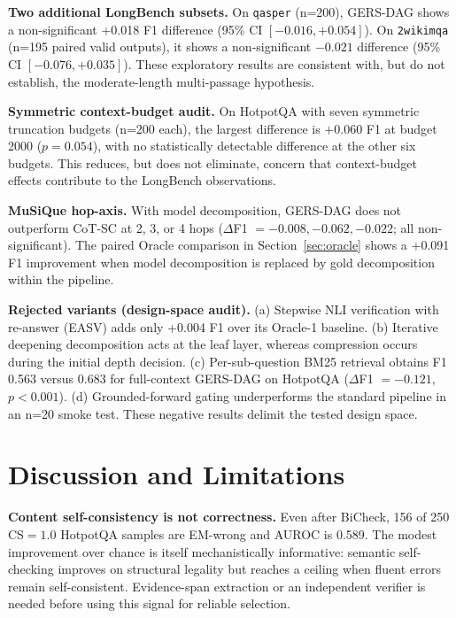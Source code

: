\documentclass[letterpaper]{article} %
\begin{document}
\noindent\textbf{Two additional LongBench subsets.} On \texttt{qasper} (n=200), GERS-DAG shows a non-significant +0.018 F1 difference (95\% CI $[-0.016,+0.054]$). On \texttt{2wikimqa} (n=195 paired valid outputs), it shows a non-significant $-0.021$ difference (95\% CI $[-0.076,+0.035]$). These exploratory results are consistent with, but do not establish, the moderate-length multi-passage hypothesis.

\noindent\textbf{Symmetric context-budget audit.} On HotpotQA with seven symmetric truncation budgets (n=200 each), the largest difference is $+0.060$ F1 at budget 2000 ($p{=}0.054$), with no statistically detectable difference at the other six budgets. This reduces, but does not eliminate, concern that context-budget effects contribute to the LongBench observations.

\noindent\textbf{MuSiQue hop-axis.} With model decomposition, GERS-DAG does not outperform CoT-SC at 2, 3, or 4 hops ($\Delta$F1 $=-0.008,-0.062,-0.022$; all non-significant). The paired Oracle comparison in Section~\ref{sec:oracle} shows a +0.091 F1 improvement when model decomposition is replaced by gold decomposition within the pipeline.

\noindent\textbf{Rejected variants (design-space audit).} (a) Stepwise NLI verification with re-answer (EASV) adds only +0.004 F1 over its Oracle-1 baseline. (b) Iterative deepening decomposition acts at the leaf layer, whereas compression occurs during the initial depth decision. (c) Per-sub-question BM25 retrieval obtains F1 0.563 versus 0.683 for full-context GERS-DAG on HotpotQA ($\Delta$F1 $=-0.121$, $p{<}0.001$). (d) Grounded-forward gating underperforms the standard pipeline in an n=20 smoke test. These negative results delimit the tested design space.

\section{Discussion and Limitations}
\label{sec:discussion}

\noindent\textbf{Content self-consistency is not correctness.} Even after BiCheck, 156 of 250 CS${=}1.0$ HotpotQA samples are EM-wrong and AUROC is 0.589. The modest improvement over chance is itself mechanistically informative: semantic self-checking improves on structural legality but reaches a ceiling when fluent errors remain self-consistent. Evidence-span extraction or an independent verifier is needed before using this signal for reliable selection.
\end{document}
